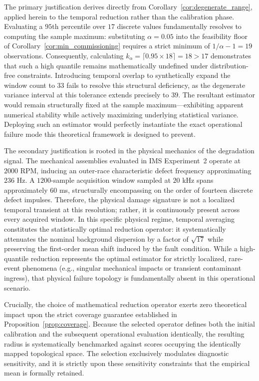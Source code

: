 \documentclass[a4paper]{cas-sc}
\begin{document}
The primary justification derives directly from Corollary~\ref{cor:degenerate_range}, applied herein to the temporal reduction rather than the calibration phase. Evaluating a \(95\)th percentile over \(17\) discrete values fundamentally resolves to computing the sample maximum: substituting \(\alpha=0.05\) into the feasibility floor of Corollary~\ref{cor:min_commissioning} requires a strict minimum of \(1/\alpha-1=19\) observations. Consequently, calculating \(k_\alpha=\lceil 0.95\times 18\rceil = 18 > 17\) demonstrates that such a high quantile remains mathematically undefined under distribution-free constraints. Introducing temporal overlap to synthetically expand the window count to \(33\) fails to resolve this structural deficiency, as the degenerate variance interval at this tolerance extends precisely to \(39\). The resultant estimator would remain structurally fixed at the sample maximum—exhibiting apparent numerical stability while actively maximizing underlying statistical variance. Deploying such an estimator would perfectly instantiate the exact operational failure mode this theoretical framework is designed to prevent.

The secondary justification is rooted in the physical mechanics of the degradation signal. The mechanical assemblies evaluated in IMS Experiment~2 operate at \(2000\) RPM, inducing an outer-race characteristic defect frequency approximating \(236\) Hz. A \(1200\)-sample acquisition window sampled at \(20\) kHz spans approximately \(60\) ms, structurally encompassing on the order of fourteen discrete defect impulses. Therefore, the physical damage signature is not a localized temporal transient at this resolution; rather, it is continuously present across every acquired window. In this specific physical regime, temporal averaging constitutes the statistically optimal reduction operator: it systematically attenuates the nominal background dispersion by a factor of \(\sqrt{17}\) while preserving the first-order mean shift induced by the fault condition. While a high-quantile reduction represents the optimal estimator for strictly localized, rare-event phenomena (e.g., singular mechanical impacts or transient contaminant ingress), that physical failure topology is fundamentally absent in this operational scenario.

Crucially, the choice of mathematical reduction operator exerts zero theoretical impact upon the strict coverage guarantee established in Proposition~\ref{prop:coverage}. Because the selected operator defines both the initial calibration and the subsequent operational evaluation identically, the resulting radius is systematically benchmarked against scores occupying the identically mapped topological space. The selection exclusively modulates diagnostic sensitivity, and it is strictly upon these sensitivity constraints that the empirical mean is formally retained.
\end{document}
